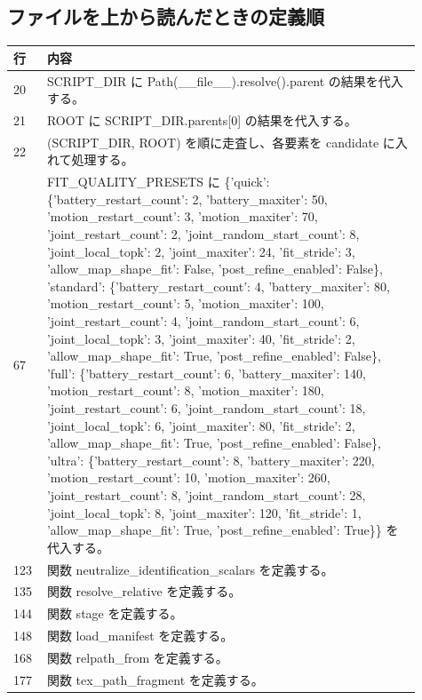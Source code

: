 \documentclass[a4paper,11pt]{article}
\begin{document}
        \subsection{ファイルを上から読んだときの定義順}
            \begin{longtable}{p{0.07\linewidth} p{0.84\linewidth}}
            \toprule
            行 & 内容 \\
            \midrule
            20 & SCRIPT\_DIR に Path(\_\_file\_\_).resolve().parent の結果を代入する。 \\
21 & ROOT に SCRIPT\_DIR.parents[0] の結果を代入する。 \\
22 & (SCRIPT\_DIR, ROOT) を順に走査し、各要素を candidate に入れて処理する。 \\
67 & FIT\_QUALITY\_PRESETS に \{'quick': \{'battery\_restart\_count': 2, 'battery\_maxiter': 50, 'motion\_restart\_count': 3, 'motion\_maxiter': 70, 'joint\_restart\_count': 2, 'joint\_random\_start\_count': 8, 'joint\_local\_topk': 2, 'joint\_maxiter': 24, 'fit\_stride': 3, 'allow\_map\_shape\_fit': False, 'post\_refine\_enabled': False\}, 'standard': \{'battery\_restart\_count': 4, 'battery\_maxiter': 80, 'motion\_restart\_count': 5, 'motion\_maxiter': 100, 'joint\_restart\_count': 4, 'joint\_random\_start\_count': 6, 'joint\_local\_topk': 3, 'joint\_maxiter': 40, 'fit\_stride': 2, 'allow\_map\_shape\_fit': True, 'post\_refine\_enabled': False\}, 'full': \{'battery\_restart\_count': 6, 'battery\_maxiter': 140, 'motion\_restart\_count': 8, 'motion\_maxiter': 180, 'joint\_restart\_count': 6, 'joint\_random\_start\_count': 18, 'joint\_local\_topk': 6, 'joint\_maxiter': 80, 'fit\_stride': 2, 'allow\_map\_shape\_fit': True, 'post\_refine\_enabled': False\}, 'ultra': \{'battery\_restart\_count': 8, 'battery\_maxiter': 220, 'motion\_restart\_count': 10, 'motion\_maxiter': 260, 'joint\_restart\_count': 8, 'joint\_random\_start\_count': 28, 'joint\_local\_topk': 8, 'joint\_maxiter': 120, 'fit\_stride': 1, 'allow\_map\_shape\_fit': True, 'post\_refine\_enabled': True\}\} を代入する。 \\
123 & 関数 neutralize\_identification\_scalars を定義する。 \\
135 & 関数 resolve\_relative を定義する。 \\
144 & 関数 stage を定義する。 \\
148 & 関数 load\_manifest を定義する。 \\
168 & 関数 relpath\_from を定義する。 \\
177 & 関数 tex\_path\_fragment を定義する。 \\

\end{longtable}
\end{document}
